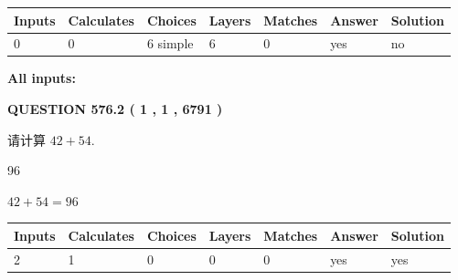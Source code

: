 \documentclass{ctexart}
\begin{document}
   
\noindent\begin{tabular}{|l|l|l|l|l|l|l|}
 \hline
Inputs & Calculates & Choices & Layers & Matches & Answer & Solution \\ \hline
 0  & 
 0  & 
 6
  simple  
  & 
 6  & 
 0  & 
  yes & 
  no 
  \\ \hline
 \end{tabular}
   
   
   
   
\noindent{}
   
   
   
   
\noindent\vspace{0.1in}\hspace{-0.08in} {\textbf{\Large{All inputs: }}}
   
   
  
\vspace{0.2in}
  
{\textbf{\Large{QUESTION
576.2 
 ( 1 , 1 , 6791 )
}}}
  
  
 
请计算 $ %
42 +  %
54 $.
 
 
 
\noindent{}
 
 

96
 
 
\noindent{}
 
 

 
 
 
\noindent{}
 
 

$ %
42 +  %
54=   %
96$
 
 
\noindent{}
 
 

 
   
   
   
   
\noindent\begin{tabular}{|l|l|l|l|l|l|l|}
 \hline
Inputs & Calculates & Choices & Layers & Matches & Answer & Solution \\ \hline
 2  & 
 1  & 
 0
  & 
 0  & 
 0  & 
  yes & 
  yes 
  \\ \hline
 \end{tabular}
   
\end{document}
